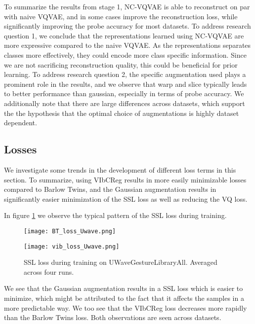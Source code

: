 \documentclass[../../thesis.tex]{subfiles}
\begin{document}
To summarize the results from stage 1,  NC-VQVAE is able to reconstruct on par with naive VQVAE, and in some cases improve the reconstruction loss, while significantly improving the probe accuracy for most datasets. To address research question 1, we conclude that the representations learned using NC-VQVAE are more expressive compared to the naive VQVAE. As the representations separates classes more effectively, they could encode more class specific information. Since we are not sacrificing reconstruction quality, this could be beneficial for prior learning. To address research question 2, the specific augmentation used plays a prominent role in the results, and we observe that warp and slice typically leads to better performance than gaussian, especially in terms of probe accuracy. We additionally note that there are large differences across datasets, which support the the hypothesis that the optimal choice of augmentations is highly dataset dependent.

\subsection{Losses}

We investigate some trends in the development of different loss terms in this section. To summarize, using VIbCReg results in more easily minimizable losses compared to Barlow Twins, and the Gaussian augmentation results in significantly easier minimization of the SSL loss as well as reducing the VQ loss. \newline

In figure \ref{fig:SSL_loss_UWave} we observe the typical pattern of the SSL loss during training. 
\begin{figure}[h]
    \centering
    \begin{minipage}[b]{0.49\textwidth}
        \centering
        \texttt{[image: BT\_loss\_Uwave.png]}
    \end{minipage}
    \hfill
    \begin{minipage}[b]{0.49\textwidth}
        \centering
        \texttt{[image: vib\_loss\_Uwave.png]}
    \end{minipage}
    \caption{SSL loss during training on UWaveGestureLibraryAll. Averaged across four runs.}
    \label{fig:SSL_loss_UWave}
\end{figure}

We see that the Gaussian augmentation results in a SSL loss which is easier to minimize, which might be attributed to the fact that it affects the samples in a more predictable way. We too see that the VIbCReg loss decreases more rapidly than the Barlow Twins loss. Both observations are seen across datasets. \newline
\end{document}
